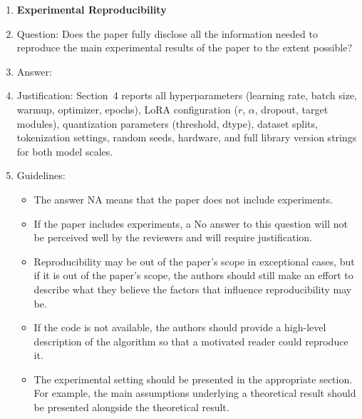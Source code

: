 \documentclass{article}
\begin{document}
\begin{enumerate}
\item {\bf Experimental Reproducibility}
\item[] Question: Does the paper fully disclose all the information needed to reproduce the main experimental results of the paper to the extent possible?
\item[] Answer: \answerYes{}
\item[] Justification: Section~4 reports all hyperparameters (learning rate, batch size, warmup, optimizer, epochs), LoRA configuration ($r$, $\alpha$, dropout, target modules), quantization parameters (threshold, dtype), dataset splits, tokenization settings, random seeds, hardware, and full library version strings for both model scales.
\item[] Guidelines:
\begin{itemize}
    \item The answer NA means that the paper does not include experiments.
    \item If the paper includes experiments, a No answer to this question will not be perceived well by the reviewers and will require justification.
    \item Reproducibility may be out of the paper's scope in exceptional cases, but if it is out of the paper's scope, the authors should still make an effort to describe what they believe the factors that influence reproducibility may be.
    \item If the code is not available, the authors should provide a high-level description of the algorithm so that a motivated reader could reproduce it.
    \item The experimental setting should be presented in the appropriate section. For example, the main assumptions underlying a theoretical result should be presented alongside the theoretical result.
\end{itemize}


\end{enumerate}
\end{document}
